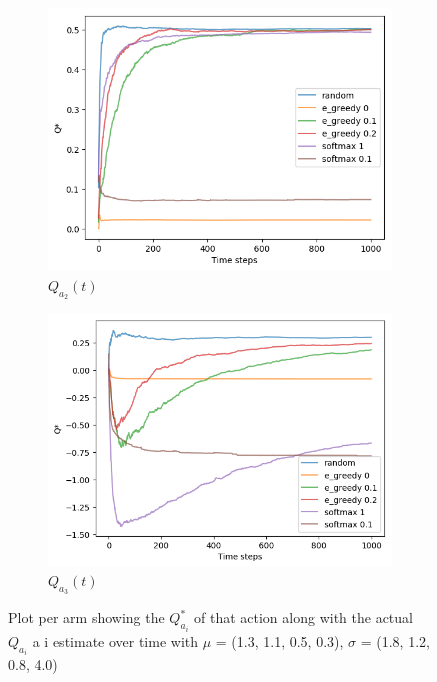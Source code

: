 \documentclass[letterpaper]{article}
\begin{document}
\begin{figure}[H]
\begin{subfigure}{.5\textwidth}
    \includegraphics[width=1\linewidth]{images/assign3/ex2/qta_2}
    \caption{$Q_{a_{2}}(t)$}
    \label{fig:qta_2_ex2}
  \end{subfigure}
  \begin{subfigure}{.5\textwidth}
    \centering
    \includegraphics[width=1\linewidth]{images/assign3/ex2/qta_3}
    \caption{$Q_{a_{3}}(t)$}
    \label{fig:qta_3_ex2}
  \end{subfigure}

    \caption{Plot per arm showing
    the $Q^{*}_{a_{i}}$
    of that action along with the actual $Q_{a_{i}}$ a i estimate over time
    with
    $\mu$ = (1.3, 1.1, 0.5, 0.3), $\sigma$ = (1.8, 1.2, 0.8, 4.0)}
    \label{fig:qtas_ex2}
\end{figure}
\end{document}
